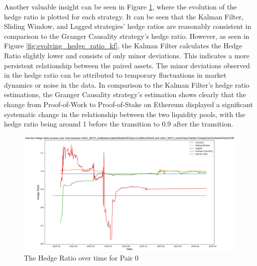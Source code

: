 \noindent Another valuable insight can be seen in Figure \ref{fig:HedgeRatioPerStrat}, where the evolution of the hedge ratio is plotted for each strategy. It can be seen that the Kalman Filter, Sliding Window, and Lagged strategies' hedge ratios are reasonably consistent in comparison to the Granger Causality strategy's hedge ratio. However, as seen in Figure \ref{fig:evolving_hedge_ratio_kf}, the Kalman Filter calculates the Hedge Ratio slightly lower and consists of only minor deviations. This indicates a more persistent relationship between the paired assets. The minor deviations observed in the hedge ratio can be attributed to temporary fluctuations in market dynamics or noise in the data. In comparison to the Kalman Filter's hedge ratio estimations, the Granger Causality strategy's estimation shows clearly that the change from Proof-of-Work to Proof-of-Stake on Ethereum displayed a significant systematic change in the relationship between the two liquidity pools, with the hedge ratio being around 1 before the transition to 0.9 after the transition.

\begin{figure}[H]
    \centering
    \includegraphics[width=\linewidth]{evaluation/Images/HedgeRatioPerStrat.png}
    \caption{The Hedge Ratio over time for Pair 0}
    \label{fig:HedgeRatioPerStrat}
\end{figure}

